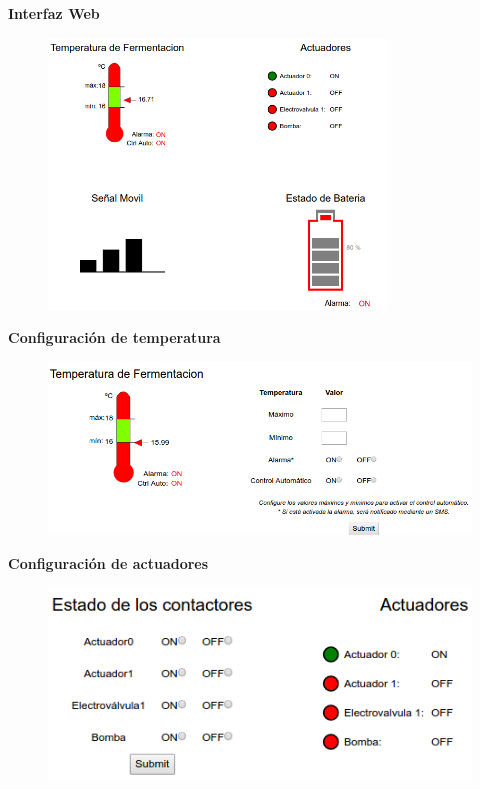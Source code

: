 \documentclass[11pt]{beamer}
\begin{document}
\begin{frame}{\textbf{\LARGE{Interfaz Web}}}
  \vspace{-.7cm}
  \begin{figure}[H]
    {\includegraphics[width=0.8\textwidth]{./imagenes/web_monitoreo.png}}
  \end{figure}	
\end{frame}

\begin{frame}{\textbf{\LARGE{Configuración de temperatura}}}
  \vspace{-.7cm}
  \begin{figure}[H]
    {\includegraphics[width=1\textwidth]{./imagenes/config_temp.png}}
  \end{figure}	
\end{frame}

\begin{frame}{\textbf{\LARGE{Configuración de actuadores}}}
  \vspace{-30px}
  \hspace{5px}
  \begin{figure}[H]
    \centering
    {\includegraphics[width=.8\textwidth]{./imagenes/config_act.png}}
  \end{figure}	
\end{frame}
\end{document}
